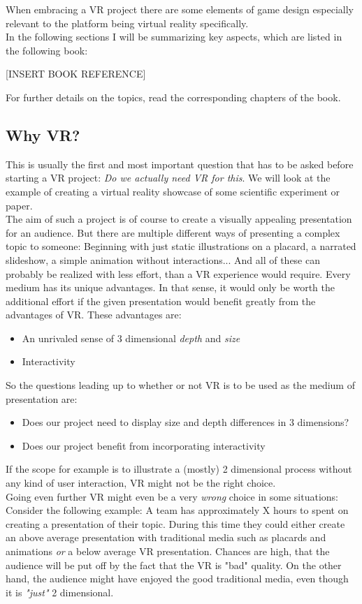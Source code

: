 When embracing a VR project there are some elements of game design especially relevant to the platform being virtual reality specifically.\\
In the following sections I will be summarizing key aspects, which are listed in the following book:

[INSERT BOOK REFERENCE]

For further details on the topics, read the corresponding chapters of the book.

\subsection{Why VR?}

This is usually the first and most important question that has to be asked before starting a VR project: \textit{Do we actually need VR for this}. We will look at the example of creating a virtual reality showcase of some scientific experiment or paper.\\ 
The aim of such a project is of course to create a visually appealing presentation for an audience. But there are multiple different ways of presenting a complex topic to someone: Beginning with just static illustrations on a placard, a narrated slideshow, a simple animation without interactions... And all of these can probably be realized with less effort, than a VR experience would require. Every medium has its unique advantages. In that sense, it would only be worth the additional effort if the given presentation would benefit greatly from the advantages of VR. These advantages are:

\begin{itemize}
\item An unrivaled sense of 3 dimensional \textit{depth} and \textit{size}
\item Interactivity
\end{itemize}

So the questions leading up to whether or not VR is to be used as the medium of presentation are:

\begin{itemize}
\item Does our project need to display size and depth differences in 3 dimensions?
\item Does our project benefit from incorporating interactivity
\end{itemize}

If the scope for example is to illustrate a (mostly) 2 dimensional process without any kind of user interaction, VR might not be the right choice.\\
Going even further VR might even be a very \textit{wrong} choice in some situations: Consider the following example: A team has approximately X hours to spent on creating a presentation of their topic. During this time they could either create an above average presentation with traditional media such as placards and animations \textit{or} a below average VR presentation. Chances are high, that the audience will be put off by the fact that the VR is "bad" quality. On the other hand, the audience might have enjoyed the good traditional media, even though it is \textit{"just"} 2 dimensional.

